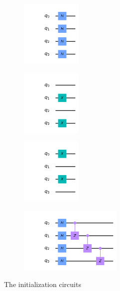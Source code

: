 \documentclass[10pt]{amsart}
\theoremstyle{definition}
\begin{document}
\begin{figure}[ht]
  \begin{subfigure}{0.4\textwidth}
    \centering
    \includegraphics[height=1.25in]{init_unif.png}
  \end{subfigure}
  \begin{subfigure}{0.4\textwidth}
    \centering
    \includegraphics[height=1.25in]{init_sing_one.png}
  \end{subfigure}
  
  \begin{subfigure}{0.4\textwidth}
    \centering
    \includegraphics[height=1.25in]{init_sing_two.png}
  \end{subfigure}
  \begin{subfigure}{0.4\textwidth}
    \centering
    \includegraphics[height=1.25in]{init_clust.png}
  \end{subfigure}
  \caption{The initialization circuits}
  \label{fig:init}  
\end{figure}
\end{document}
